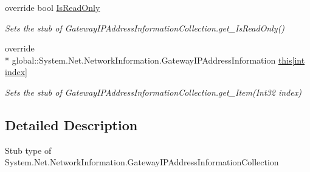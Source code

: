 \begin{DoxyCompactItemize}
override bool \hyperlink{class_system_1_1_net_1_1_network_information_1_1_fakes_1_1_stub_gateway_i_p_address_information_collection_a092097b67cf6fd2755cb60388a592769}{Is\-Read\-Only}
\begin{DoxyCompactList}\small\item\em Sets the stub of Gateway\-I\-P\-Address\-Information\-Collection.\-get\-\_\-\-Is\-Read\-Only()\end{DoxyCompactList}\item 
override \\*
global\-::\-System.\-Net.\-Network\-Information.\-Gateway\-I\-P\-Address\-Information \hyperlink{class_system_1_1_net_1_1_network_information_1_1_fakes_1_1_stub_gateway_i_p_address_information_collection_a80ffdbf6ef0d94956b72131ca1620e2d}{this\mbox{[}int index\mbox{]}}
\begin{DoxyCompactList}\small\item\em Sets the stub of Gateway\-I\-P\-Address\-Information\-Collection.\-get\-\_\-\-Item(\-Int32 index)\end{DoxyCompactList}\end{DoxyCompactItemize}


\subsection{Detailed Description}
Stub type of System.\-Net.\-Network\-Information.\-Gateway\-I\-P\-Address\-Information\-Collection



